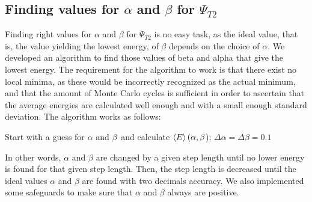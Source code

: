 \documentclass[10pt,a4paper]{article}
\begin{document}
\subsection{Finding values for $\alpha$ and $\beta$ for $\Psi_{T2}$}
Finding right values for $\alpha$ and $\beta$ for $\Psi_{T2}$ is no easy task, as the ideal value, that is, the value yielding the lowest energy, of $\beta$ depends on the choice of $\alpha$. We developed an algorithm to find those values of beta and alpha that give the lowest energy. The requirement for the algorithm to work is that there exist no local minima, as these would be incorrectly recognized as the actual minimum, and that the amount of Monte Carlo cycles is sufficient in order to ascertain that the average energies are calculated well enough and with a small enough standard deviation. 
The algorithm works as follows:\\
\IncMargin{1em}
\begin{algorithm}[H]  
    Start with a guess for $\alpha$ and $\beta$\ and calculate $\braket{E}(\alpha,\beta$);
    $\Delta\alpha=\Delta\beta=0.1$\;
\end{algorithm}
\DecMargin{1em}
In other words, $\alpha$ and $\beta$ are changed by a given step length until no lower energy is found  for that given step length. Then, the step length is decreased until the ideal values $\alpha$ and $\beta$ are found with two decimals accuracy. We also implemented some safeguards to make sure that $\alpha$ and $\beta$ always are positive.
\end{document}
